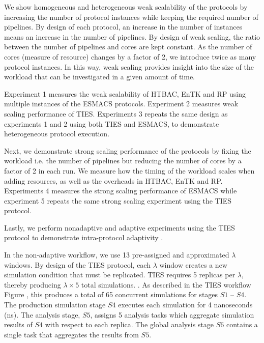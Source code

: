 We show homogeneous and heterogeneous weak scalability of the protocols by
increasing the number of protocol instances while keeping the required number
of pipelines. By design of each protocol, an increase in the number of
instances means an increase in the number of pipelines.  By design of
weak scaling, the ratio between the number of pipelines and cores are kept
constant. As the number of cores (measure of resource) changes by a factor of
2, we introduce twice as many protocol instances. In this way, weak scaling
provides insight into the size of the workload that can be investigated in a
given amount of time.

Experiment 1 measures the weak scalability of HTBAC, EnTK and RP using
multiple instances of the ESMACS protocols. Experiment 2 measures weak
scaling performance of TIES. Experiments 3 repeats the same design as
experiments 1 and 2 using both TIES and ESMACS, to demonstrate heterogeneous
protocol execution.%

Next, we demonstrate strong scaling performance of the protocols by fixing
the workload i.e. the number of pipelines but reducing the number of cores by
a factor of 2 in each run. We measure how the timing of the workload scales when adding resources,
 as well as the
overheads in HTBAC, EnTK and RP. Experiments 4 measures the strong scaling
performance of ESMACS while experiment 5 repeats the same strong scaling
experiment using the TIES protocol.

Lastly, we perform nonadaptive and adaptive experiments using the TIES
protocol to demonstrate intra-protocol adaptivity .

In the non-adaptive workflow, we use 13 pre-assigned and approximated
$\lambda$ windows.  By design of the TIES protocol, each $\lambda$ window
creates a new simulation condition that must be replicated. TIES requires 5
replicas per $\lambda$, thereby producing $\lambda \times 5$ total
simulations. . As described in the TIES workflow Figure
, this produces a total of 65 concurrent
simulations for stages $S1$ -- $S4$. The production simulation stage $S4$
executes each simulation for 4 nanoseconds (ns). The analysis stage, $S5$,
assigns 5 analysis tasks which aggregate simulation results of $S4$ with
respect to each replica. The global analysis stage $S6$ contains a single
task that aggregates the results from $S5$.

